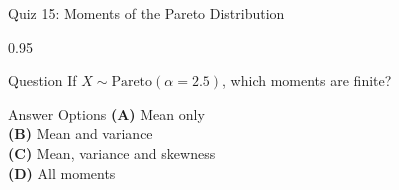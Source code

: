 \documentclass[9pt, aspectratio=169, t]{beamer}
\begin{document}
\begin{frame}{Quiz 15: Moments of the Pareto Distribution}
\begin{cminipage}{0.95\textwidth}
    \begin{alertblock}{Question}
        If $X \sim \text{Pareto}(\alpha = 2.5)$, which moments are finite?
    \end{alertblock}

    \vspace{0.5cm}
    \begin{block}{Answer Options}
    \textcolor{MainBlue}{\textbf{(A)}} Mean only\\[3pt]
    \textcolor{MainBlue}{\textbf{(B)}} Mean and variance\\[3pt]
    \textcolor{MainBlue}{\textbf{(C)}} Mean, variance and skewness\\[3pt]
    \textcolor{MainBlue}{\textbf{(D)}} All moments
    \end{block}
\end{cminipage}
\end{frame}
\end{document}

